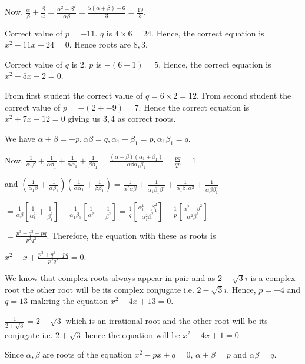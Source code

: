   Now, $\frac{\alpha}{\beta} + \frac{\beta}{\alpha} = \frac{\alpha^2 + \beta^2}{\alpha\beta} =
  \frac{5(\alpha + \beta) - 6}{3} = \frac{19}{3}$.
\item Correct value of $p = -11$. $q$ is $4\times 6 = 24$. Hence, the correct equation is $x^2 - 11x + 24 =
  0$. Hence roots are $8, 3$.
\item Correct value of $q$ is $2$. $p$ is $-(6 - 1) = 5$. Hence, the correct equation is $x^2 - 5x + 2 = 0$.
\item From first student the correct value of $q = 6\times2 = 12$. From second student the correct value of
  $p = -(2 + -9) = 7$. Hence the correct equation is $x^2 + 7x + 12 = 0$ giving us $3, 4$ as correct roots.
\item We have $\alpha + \beta = -p, \alpha\beta = q, \alpha_1 + \beta_1 = p, \alpha_1\beta_1 = q$.

  Now, $\frac{1}{\alpha_1\beta} + \frac{1}{\alpha\beta_1} + \frac{1}{\alpha\alpha_1}+ \frac{1}{\beta\beta_1} =
  \frac{(\alpha + \beta)(\alpha_1 + \beta_1)}{\alpha\beta\alpha_1\beta_1} = \frac{pq}{qp} = 1$

  and $\left(\frac{1}{\alpha_1\beta} + \frac{1}{\alpha\beta_1}\right)\left(\frac{1}{\alpha\alpha_1} +
  \frac{1}{\beta\beta_1}\right) = \frac{1}{\alpha_1^2\alpha\beta} + \frac{1}{\alpha_1\beta_1\beta^2} +
  \frac{1}{\alpha_1\beta_1\alpha^2} + \frac{1}{\alpha\beta\beta_1^2}$

  $= \frac{1}{\alpha\beta}\left[\frac{1}{\alpha_1^2} + \frac{1}{\beta_1^2}\right] +
  \frac{1}{\alpha_1\beta_1}\left[\frac{1}{\alpha^2} + \frac{1}{\beta^2}\right] =
  \frac{1}{q}\left[\frac{\alpha_1^1 + \beta_1^2}{\alpha_1^2\beta_1^2}\right] +
  \frac{1}{p}\left[\frac{\alpha^2 + \beta^2}{\alpha^2\beta^2}\right]$

  $= \frac{p^3 + q^3 - pq}{p^2q^2}$. Therefore, the equation with these as roots is

  $x^2 - x + \frac{p^3 + q^3 - pq}{p^2q^2} = 0$.
\item We know that complex roots always appear in pair and as $2 + \sqrt{3}i$ is a complex root the other
  root will be its complex conjugate i.e. $2 - \sqrt{3}i$. Hence, $p = -4$ and $q = 13$ makring the equation
  $x^2 - 4x + 13 = 0$.
\item $\frac{1}{2 + \sqrt{3}} = 2 - \sqrt{3}$ which is an irrational root and the other root will be its
  conjugate i.e. $2 + \sqrt{3}$ hence the equation will be $x^2 - 4x + 1 = 0$
\item Since $\alpha, \beta$ are roots of the equation $x^2 - px + q = 0$, $\alpha + \beta = p$ and
  $\alpha\beta = q$.

